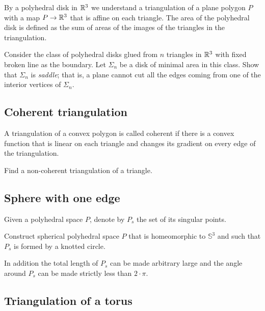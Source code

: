 By a polyhedral disk in $\mathbb{R}^3$
we understand a triangulation of a plane polygon $P$ with a map $P\to\mathbb{R}^3$ that is affine on each triangle.
The area of the polyhedral disk is defined as the sum of areas of the images of the triangles in the triangulation.

\begin{pr}
Consider the  class of polyhedral disks glued from $n$ triangles in $\mathbb{R}^3$ 
with fixed broken line as the boundary.
Let $\Sigma_n$ be a disk of minimal area in this class.
Show that $\Sigma_n$ is  \emph{saddle};
that is, a plane cannot cut all the edges coming from one of the interior vertices of $\Sigma_n$.
\end{pr}

\subsection*{Coherent triangulation\easy}\label{Coherent triangulation} 

A triangulation of a convex polygon is called coherent if there is a convex function that is linear on each triangle and changes its gradient on every edge of the triangulation.

\begin{pr}
Find a non-coherent triangulation of a triangle.
\end{pr}



\subsection*{Sphere with one edge\hard}\label{panov-S^3} 

Given  a polyhedral space $P$,
denote by $P_s$ the set of its 
singular points.

\begin{pr}
Construct spherical polyhedral space $P$ that is homeomorphic to $\mathbb{S}^3$ and such that $P_s$ is formed by a knotted circle.
\end{pr}

In addition the total length of $P_s$ can be made arbitrary large and the angle around $P_s$ can be made strictly less than $2\cdot\pi$.

\subsection*{Triangulation of a torus}\label{Triangulation of a torus}

